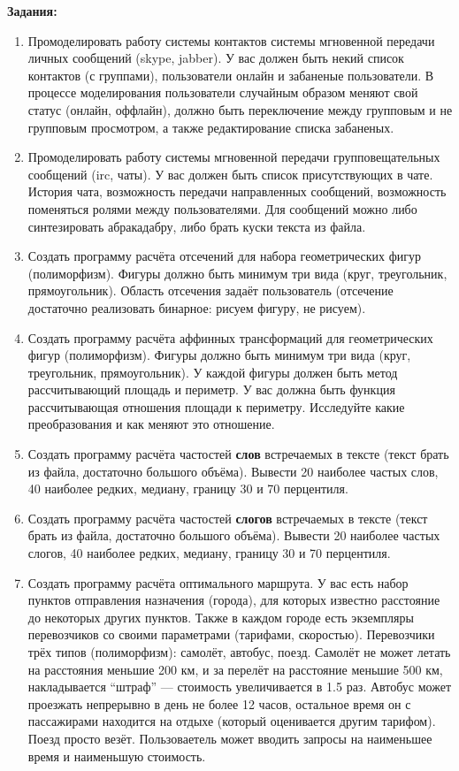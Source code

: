 \documentclass[12pt, oneside]{article}
\begin{document}
 \textbf{Задания:}
 \begin{enumerate}
  \item Промоделировать работу системы контактов системы мгновенной передачи личных сообщений (skype, jabber). У вас должен быть некий список контактов (с группами), пользователи онлайн и забаненые пользователи. В процессе моделирования пользователи случайным образом меняют свой статус (онлайн, оффлайн), должно быть переключение между групповым и не групповым просмотром, а также редактирование списка забаненых.
  \item Промоделировать работу системы мгновенной передачи групповещательных сообщений (irc, чаты). У вас должен быть список присутствующих в чате. История чата, возможность передачи направленных сообщений, возможность поменяться ролями между пользователями. Для сообщений можно либо синтезировать абракадабру, либо брать куски текста из файла.
  \item Создать программу расчёта отсечений для набора геометрических фигур (полиморфизм). Фигуры должно быть минимум три вида (круг, треугольник, прямоугольник). Область отсечения задаёт пользователь (отсечение достаточно реализовать бинарное: рисуем фигуру, не рисуем).
  \item Создать программу расчёта аффинных трансформаций для геометрических фигур (полиморфизм). Фигуры должно быть минимум три вида (круг, треугольник, прямоугольник). У каждой фигуры должен быть метод рассчитывающий площадь и периметр. У вас должна быть функция рассчитывающая отношения площади к периметру. Исследуйте какие преобразования и как меняют это отношение.
  \item Создать программу расчёта частостей \textbf{слов} встречаемых в тексте (текст брать из файла, достаточно большого объёма). Вывести 20 наиболее частых слов, 40 наиболее редких, медиану, границу 30 и 70 перцентиля.
  \item Создать программу расчёта частостей \textbf{слогов} встречаемых в тексте (текст брать из файла, достаточно большого объёма). Вывести 20 наиболее частых слогов, 40 наиболее редких, медиану, границу 30 и 70 перцентиля.
  \item Создать программу расчёта оптимального маршрута. У вас есть набор пунктов отправления назначения (города), для которых известно расстояние до некоторых других пунктов. Также в каждом городе есть экземпляры перевозчиков со своими параметрами (тарифами, скоростью). Перевозчики трёх типов (полиморфизм): самолёт, автобус, поезд. Самолёт не может летать на расстояния меньшие 200 км, и за перелёт на расстояние меньшие 500 км, накладывается ``штраф'' --- стоимость увеличивается в 1.5 раз. Автобус может проезжать непрерывно в день не более 12 часов, остальное время он с пассажирами находится на отдыхе (который оценивается другим тарифом). Поезд просто везёт. Пользоваетель может вводить запросы на наименьшее время и наименьшую стоимость.

\end{enumerate}
\end{document}
